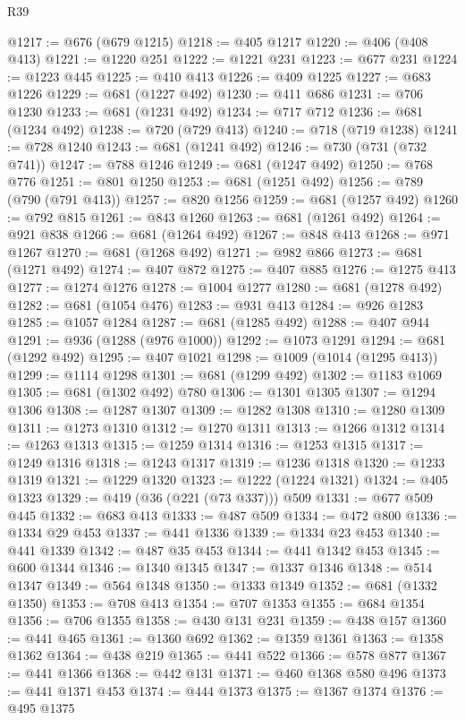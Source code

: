 \begin{lexlean}{R39}
\begin{coremodule}
@1217 := @676 (@679 @1215)
@1218 := @405 @1217
@1220 := @406 (@408 @413)
@1221 := @1220 @251
@1222 := @1221 @231
@1223 := @677 @231
@1224 := @1223 @445
@1225 := @410 @413
@1226 := @409 @1225
@1227 := @683 @1226
@1229 := @681 (@1227 @492)
@1230 := @411 @686
@1231 := @706 @1230
@1233 := @681 (@1231 @492)
@1234 := @717 @712
@1236 := @681 (@1234 @492)
@1238 := @720 (@729 @413)
@1240 := @718 (@719 @1238)
@1241 := @728 @1240
@1243 := @681 (@1241 @492)
@1246 := @730 (@731 (@732 @741))
@1247 := @788 @1246
@1249 := @681 (@1247 @492)
@1250 := @768 @776
@1251 := @801 @1250
@1253 := @681 (@1251 @492)
@1256 := @789 (@790 (@791 @413))
@1257 := @820 @1256
@1259 := @681 (@1257 @492)
@1260 := @792 @815
@1261 := @843 @1260
@1263 := @681 (@1261 @492)
@1264 := @921 @838
@1266 := @681 (@1264 @492)
@1267 := @848 @413
@1268 := @971 @1267
@1270 := @681 (@1268 @492)
@1271 := @982 @866
@1273 := @681 (@1271 @492)
@1274 := @407 @872
@1275 := @407 @885
@1276 := @1275 @413
@1277 := @1274 @1276
@1278 := @1004 @1277
@1280 := @681 (@1278 @492)
@1282 := @681 (@1054 @476)
@1283 := @931 @413
@1284 := @926 @1283
@1285 := @1057 @1284
@1287 := @681 (@1285 @492)
@1288 := @407 @944
@1291 := @936 (@1288 (@976 @1000))
@1292 := @1073 @1291
@1294 := @681 (@1292 @492)
@1295 := @407 @1021
@1298 := @1009 (@1014 (@1295 @413))
@1299 := @1114 @1298
@1301 := @681 (@1299 @492)
@1302 := @1183 @1069
@1305 := @681 (@1302 @492) @780
@1306 := @1301 @1305
@1307 := @1294 @1306
@1308 := @1287 @1307
@1309 := @1282 @1308
@1310 := @1280 @1309
@1311 := @1273 @1310
@1312 := @1270 @1311
@1313 := @1266 @1312
@1314 := @1263 @1313
@1315 := @1259 @1314
@1316 := @1253 @1315
@1317 := @1249 @1316
@1318 := @1243 @1317
@1319 := @1236 @1318
@1320 := @1233 @1319
@1321 := @1229 @1320
@1323 := @1222 (@1224 @1321)
@1324 := @405 @1323
@1329 := @419 (@36 (@221 (@73 @337))) @509
@1331 := @677 @509 @445
@1332 := @683 @413
@1333 := @487 @509
@1334 := @472 @800
@1336 := @1334 @29 @453
@1337 := @441 @1336
@1339 := @1334 @23 @453
@1340 := @441 @1339
@1342 := @487 @35 @453
@1344 := @441 @1342 @453
@1345 := @600 @1344
@1346 := @1340 @1345
@1347 := @1337 @1346
@1348 := @514 @1347
@1349 := @564 @1348
@1350 := @1333 @1349
@1352 := @681 (@1332 @1350)
@1353 := @708 @413
@1354 := @707 @1353
@1355 := @684 @1354
@1356 := @706 @1355
@1358 := @430 @131 @231
@1359 := @438 @157
@1360 := @441 @465
@1361 := @1360 @692
@1362 := @1359 @1361
@1363 := @1358 @1362
@1364 := @438 @219
@1365 := @441 @522
@1366 := @578 @877
@1367 := @441 @1366
@1368 := @442 @131
@1371 := @460 @1368 @580 @496
@1373 := @441 @1371 @453
@1374 := @444 @1373
@1375 := @1367 @1374
@1376 := @495 @1375

\end{coremodule}
\end{lexlean}
